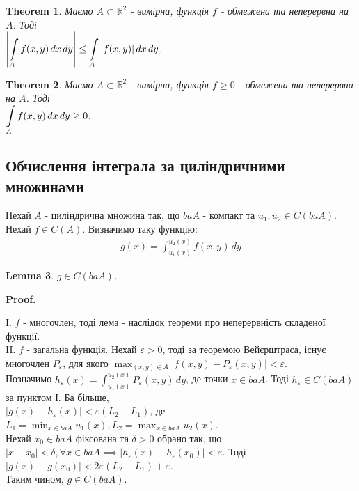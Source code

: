 \documentclass[a4paper, 10pt]{article}
\makeatletter
\def\qed{$\blacksquare$}
\theoremstyle{theoremdd}
\newtheorem{theorem}{Theorem}[subsection]
\theoremstyle{theoremdd}
\theoremstyle{theoremdd}
\theoremstyle{theoremdd}
\theoremstyle{theoremdd}
\theoremstyle{theoremdd}
\theoremstyle{theoremdd}
\newtheorem{lemma}[theorem]{Lemma}
\theoremstyle{theoremdd}
\renewenvironment{proof}[1][Proof.\\]{\par
\pushQED{\hfill \qed}%
\normalfont \topsep6\p@\@plus6\p@\relax
\trivlist
\item\relax
{\bfseries
#1\@addpunct{.}}\hspace\labelsep\ignorespaces
}{%
\popQED\endtrivlist\@endpefalse
}
\makeatother
\begin{document}
\begin{theorem}
Маємо $A \subset \mathbb{R}^2$ - вимірна, функція $f$ - обмежена та неперервна на $A$. Тоді\\
$\displaystyle\abs{\int\displaylimits_A f(x,y)\,dx\,dy} \leq \int\displaylimits_A |f(x,y)|\,dx\,dy$.
\end{theorem}

\begin{theorem}
Маємо $A \subset \mathbb{R}^2$ - вимірна, функція $f \geq 0$ - обмежена та неперервна на $A$. Тоді\\
$\displaystyle\int\displaylimits_A f(x,y)\,dx\,dy \geq 0$.
\end{theorem}

\subsection{Обчислення інтеграла за циліндричними множинами}
Нехай $A$ - циліндрична множина так, що $baA$ - компакт та $u_1,u_2 \in C(baA)$. Нехай $f \in C(A)$. Визначимо таку функцію:
\begin{align*}
g(x)= \int_{u_1(x)}^{u_2(x)} f(x,y)\,dy
\end{align*}

\begin{lemma}
$g \in C(baA)$.
\end{lemma}

\begin{proof}
I. $f$ - многочлен, тоді лема - наслідок теореми про неперервність складеної функції.\\
II. $f$ - загальна функція. Нехай $\varepsilon > 0$, тоді за теоремою Вейєрштраса, існує многочлен $P_\varepsilon$, для якого $\displaystyle\max_{(x,y) \in A} |f(x,y) - P_\varepsilon(x,y)| < \varepsilon$.\\
Позначимо $h_\varepsilon(x) = \displaystyle\int_{u_1(x)}^{u_2(x)}P_\varepsilon(x,y)\,dy$, де точки $x \in baA$. Тоді $h_\varepsilon \in C(baA)$ за пунктом І. Ба більше,\\
$|g(x)-h_\varepsilon(x)| < \varepsilon (L_2-L_1)$, де $L_1 = \displaystyle\min_{x \in baA} u_1(x), L_2 = \displaystyle\max_{x \in baA} u_2(x)$.\\
Нехай $x_0 \in baA$ фіксована та $\delta > 0$  обрано так, що $|x-x_0| < \delta, \forall x \in baA \implies |h_\varepsilon(x)-h_\varepsilon(x_0)| < \varepsilon$. Тоді\\
$|g(x)-g(x_0)| < 2\varepsilon(L_2-L_1)+\varepsilon$.\\
Таким чином, $g \in C(baA)$.
\end{proof}
\end{document}
